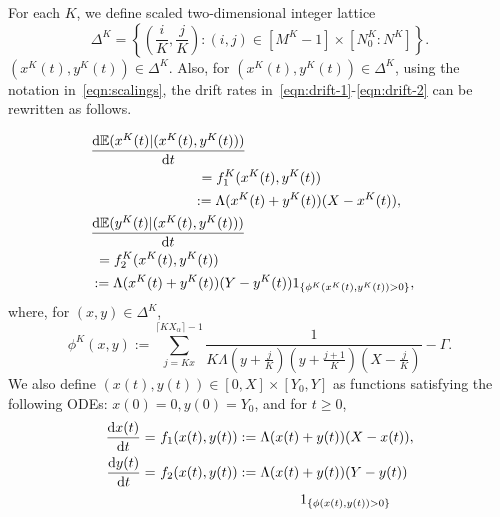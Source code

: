 \documentclass[10pt,journal,letterpaper]{IEEEtran}
\newcommand{\remove}[1]{}
\begin{document}
For each $K$, we define scaled two-dimensional integer lattice
\begin{equation*}
\Delta^K = \left\{\left(\frac{i}{K} ,\frac{j}{K}\right): (i,j) \in [M^K-1] \times [N_0^K:N^K] \right\}.
\end{equation*}
$(x^K(t),y^K(t)) \in \Delta^K$. Also, for $(x^K(t),y^K(t)) \in \Delta^K$, using the notation in~\eqref{eqn:scalings}, the
drift rates in~\eqref{eqn:drift-1}-\eqref{eqn:drift-2}  can be rewritten as follows.
\remove{
\footnote{More precisely,
$(x^K(t),y^K(t))$ lies on a scaled two-dimensional integer lattice
of the from $(i/K ,j/K)$ for some $i,j \in \mathbb{Z}_+$.}
}
\begin{subequations}
\begin{align}
&\frac{{\rm d}\mathbb{E}(x^K(t)|(x^K(t),y^K(t)))}{{\rm d}t} \nonumber \\
& \ \ \ \ \ \ \ \ \ \ \ \ \ \ \ \ \ \ \ \ \ \ \ = f^K_1(x^K(t),y^K(t)) \nonumber \\
& \ \ \ \ \ \ \ \ \ \ \ \ \ \ \ \ \ \ \ \ \ \  := \Lambda(x^K(t)+ y^K(t))(X-x^K(t)), \label{eqn:f-K_1} \\
&\frac{{\rm d}\mathbb{E}(y^K(t)|(x^K(t),y^K(t)))}{{\rm d}t} \nonumber \\
& \ = f^K_2(x^K(t),y^K(t)) &  \nonumber \\
&:= \Lambda (x^K(t) + y^K(t))(Y-y^K(t))1_{\{\phi^K(x^K(t),y^K(t)) > 0\}}, \label{eqn:f-K_2}
\end{align}
\end{subequations}
where, for $(x,y) \in \Delta^K$,
\begin{equation}
\label{eqn:phi-K}
 \phi^K(x,y) := \sum_{j = Kx}^{\lceil KX_{\alpha} \rceil -1}\frac{1}{K\Lambda(y
+ \frac{j}{K})(y + \frac{j+1}{K})(X -\frac{j}{K})} - \Gamma.
\end{equation}
We also define $(x(t),y(t)) \in [0, X] \times [Y_0,Y]$ as functions
satisfying the following ODEs: $x(0)= 0, y(0) = Y_0$, and for $t
\geq 0$,
\begin{subequations}
\begin{align}
\frac{{\rm d}x(t)}{{\rm d}t} = &~f_1(x(t),y(t)) := \Lambda (x(t) + y(t))(X-x(t)),\label{eqn:f-1} \\
\frac{{\rm d}y(t)}{{\rm d}t} = &~f_2(x(t),y(t)) := \Lambda (x(t) + y(t))(Y-y(t)) \nonumber\\
                               & \ \ \ \ \ \ \ \ \ \ \ \ \ \ \ \ \ \ \ \ \ \ \ \ \ \ \ \ \ \ \ 1_{\{\phi(x(t),y(t)) > 0\}}\label{eqn:f-2}
\end{align}
\end{subequations}
\end{document}
